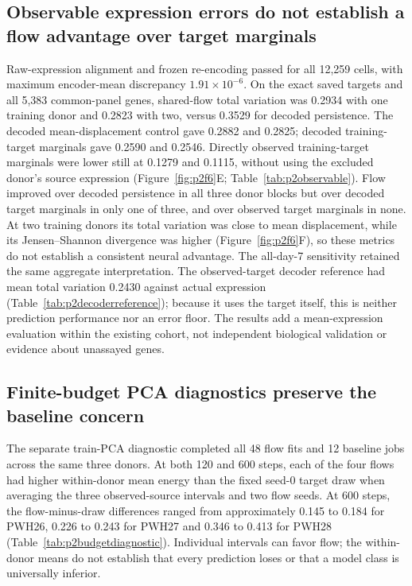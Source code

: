 \subsection{Observable expression errors do not establish a flow advantage over target marginals}

Raw-expression alignment and frozen re-encoding passed for all 12,259 cells, with maximum encoder-mean discrepancy $1.91\times10^{-6}$. On the exact saved targets and all 5,383 common-panel genes, shared-flow total variation was 0.2934 with one training donor and 0.2823 with two, versus 0.3529 for decoded persistence. The decoded mean-displacement control gave 0.2882 and 0.2825; decoded training-target marginals gave 0.2590 and 0.2546. Directly observed training-target marginals were lower still at 0.1279 and 0.1115, without using the excluded donor's source expression (Figure~\ref{fig:p2f6}E; Table~\ref{tab:p2observable}). Flow improved over decoded persistence in all three donor blocks but over decoded target marginals in only one of three, and over observed target marginals in none. At two training donors its total variation was close to mean displacement, while its Jensen--Shannon divergence was higher (Figure~\ref{fig:p2f6}F), so these metrics do not establish a consistent neural advantage. The all-day-7 sensitivity retained the same aggregate interpretation. The observed-target decoder reference had mean total variation 0.2430 against actual expression (Table~\ref{tab:p2decoderreference}); because it uses the target itself, this is neither prediction performance nor an error floor. The results add a mean-expression evaluation within the existing cohort, not independent biological validation or evidence about unassayed genes.

\subsection{Finite-budget PCA diagnostics preserve the baseline concern}

The separate train-PCA diagnostic completed all 48 flow fits and 12 baseline jobs across the same three donors. At both 120 and 600 steps, each of the four flows had higher within-donor mean energy than the fixed seed-0 target draw when averaging the three observed-source intervals and two flow seeds. At 600 steps, the flow-minus-draw differences ranged from approximately 0.145 to 0.184 for PWH26, 0.226 to 0.243 for PWH27 and 0.346 to 0.413 for PWH28 (Table~\ref{tab:p2budgetdiagnostic}). Individual intervals can favor flow; the within-donor means do not establish that every prediction loses or that a model class is universally inferior.

